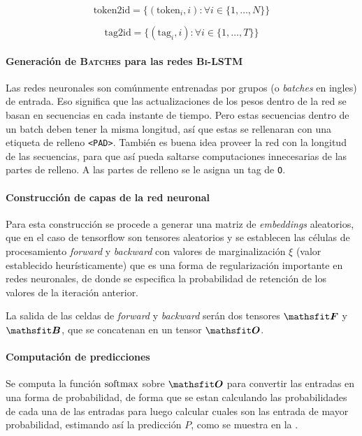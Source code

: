 \begin{equation} \label{eq:lstm-token2id}
  \text{token2id} = \Big\{(\text{token}_i, i) : \forall i \in \{1, \ldots, N\} \Big\}
\end{equation}

\begin{equation} \label{eq:lstm-tag2id}
  \text{tag2id} = \Big\{(\text{tag}_i, i) : \forall i \in \{1, \ldots, T\} \Big\}
\end{equation}

\paragraph{Generación de \textsc{Batches} para las redes \textsc{Bi-LSTM}}
Las redes neuronales son comúnmente entrenadas por grupos (o \emph{batches} en ingles) de entrada. Eso significa que las actualizaciones de los pesos dentro de la red se basan en secuencias en cada instante de tiempo. Pero estas secuencias dentro de un batch deben tener la misma longitud, así que estas se rellenaran con una etiqueta de relleno \texttt{<PAD>}. También es buena idea proveer la red con la longitud de las secuencias, para que así pueda saltarse computaciones innecesarias de las partes de relleno. A las partes de relleno se le asigna un tag de \texttt{O}.

\paragraph{Construcción de capas de la red neuronal}
Para esta construcción se procede a generar una matriz de \emph{embeddings} aleatorios, que en el caso de \gls{tensorflow} son tensores aleatorios y se establecen las células de procesamiento \emph{forward} y \emph{backward} con valores de marginalización $\xi$ (valor establecido heurísticamente) que es una forma de regularización importante en redes neuronales, de donde se especifica la probabilidad de retención de los valores de la iteración anterior.

La salida de las celdas de \emph{forward} y \emph{backward} serán dos tensores $\tF$ y $\tB$, que se concatenan en un tensor $\tO$.

\paragraph{Computación de predicciones}
Se computa la función $\mathrm{softmax}$ sobre $\tO$ para convertir las entradas en una forma de probabilidad, de forma que se estan calculando las probabilidades de cada una de las entradas para luego calcular cuales son las entrada de mayor probabilidad, estimando así la predicción $P$, como se muestra en la .

